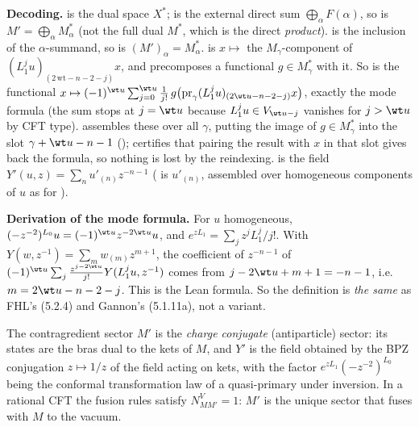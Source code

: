 \begin{dictionary}
\textbf{Decoding.}  is the dual space $X^*$;  is the external direct sum
$\bigoplus_\alpha F(\alpha)$, so  is $M' = \bigoplus_\alpha M_\alpha^*$ (not the full dual $M^*$, which is
the direct \emph{product}).  is the inclusion of the $\alpha$-summand, so
 is $(M')_\alpha = M_\alpha^*$.  is $x\mapsto$ the
$M_\gamma$-component of $(L_1^ju)_{(2\,\mathrm{wt}-n-2-j)}x$, and  precomposes a functional
$g\in M_\gamma^*$ with it. So  is the functional
$x\mapsto(-1)^{\wt u}\sum_{j=0}^{\wt u}\frac1{j!}\,g\big(\mathrm{pr}_\gamma(L_1^ju)_{(2\wt u-n-2-j)}x\big)$, exactly the
mode formula (the sum stops at $j = \wt u$ because $L_1^ju\in V_{\wt u-j}$ vanishes for $j>\wt u$ by CFT type).
 assembles these over all $\gamma$, putting the image of $g\in M_\gamma^*$ into the slot
$\gamma+\wt u-n-1$ ();  certifies that pairing the result with
$x$ in that slot gives back the formula, so nothing is lost by the reindexing.  is the field
$Y'(u,z) = \sum_n u'_{(n)}z^{-n-1}$ ( is $u'_{(n)}$, assembled over homogeneous components of
$u$ as for ).

\textbf{Derivation of the mode formula.} For $u$ homogeneous, $(-z^{-2})^{L_0}u = (-1)^{\wt u}z^{-2\wt u}u$, and
$e^{zL_1} = \sum_j z^jL_1^j/j!$. With $Y(w,z^{-1}) = \sum_m w_{(m)}z^{m+1}$, the coefficient of $z^{-n-1}$ of
$(-1)^{\wt u}\sum_j\frac{z^{j-2\wt u}}{j!}Y(L_1^ju,z^{-1})$ comes from $j-2\wt u+m+1 = -n-1$, i.e.\
$m = 2\wt u-n-2-j$. This is the Lean formula. So the definition is \emph{the same} as FHL's (5.2.4) and Gannon's
(5.1.11a), not a variant.
\end{dictionary}

\begin{physics}
The contragredient sector $M'$ is the \emph{charge conjugate} (antiparticle) sector: its states are the bras
dual to the kets of $M$, and $Y'$ is the field obtained by the BPZ conjugation $z\mapsto 1/z$ of the field acting
on kets, with the factor $e^{zL_1}(-z^{-2})^{L_0}$ being the conformal transformation law of a quasi-primary under
inversion. In a rational CFT the fusion rules satisfy $N_{MM'}^V = 1$: $M'$ is the unique sector that fuses with
$M$ to the vacuum.
\end{physics}

